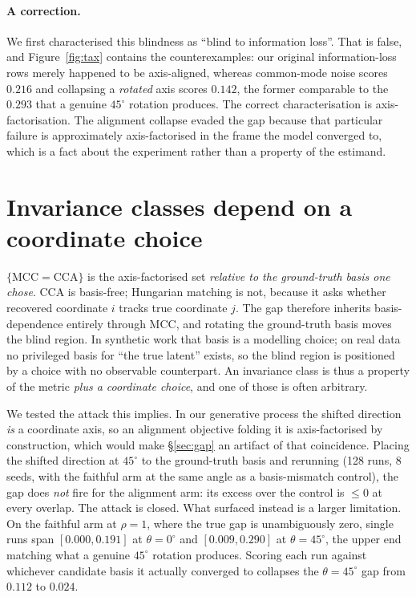 \documentclass[10pt]{article}
\begin{document}
\paragraph{A correction.} We first characterised this blindness as ``blind to information loss''. That
is false, and Figure~\ref{fig:tax} contains the counterexamples: our original information-loss rows
merely happened to be axis-aligned, whereas common-mode noise scores $0.216$ and collapsing a
\emph{rotated} axis scores $0.142$, the former comparable to the $0.293$ that a genuine $45^{\circ}$
rotation produces. The correct characterisation is axis-factorisation. The alignment collapse evaded
the gap because that particular failure is approximately axis-factorised in the frame the model
converged to, which is a fact about the experiment rather than a property of the estimand.

\section{Invariance classes depend on a coordinate choice}
\label{sec:basis}

$\{\mathrm{MCC}=\mathrm{CCA}\}$ is the axis-factorised set \emph{relative to the ground-truth basis one
chose}. CCA is basis-free; Hungarian matching is not, because it asks whether recovered coordinate $i$
tracks true coordinate $j$. The gap therefore inherits basis-dependence entirely through MCC, and
rotating the ground-truth basis moves the blind region. In synthetic work that basis is a modelling
choice; on real data no privileged basis for ``the true latent'' exists, so the blind region is
positioned by a choice with no observable counterpart. An invariance class is thus a property of the
metric \emph{plus a coordinate choice}, and one of those is often arbitrary.

We tested the attack this implies. In our generative process the shifted direction \emph{is} a
coordinate axis, so an alignment objective folding it is axis-factorised by construction, which would
make \S\ref{sec:gap} an artifact of that coincidence. Placing the shifted direction at $45^{\circ}$ to
the ground-truth basis and rerunning (128 runs, 8 seeds, with the faithful arm at the same angle as a
basis-mismatch control), the gap does \emph{not} fire for the alignment arm: its excess over the control
is $\leq0$ at every overlap. The attack is closed. What surfaced instead is a larger limitation. On the
faithful arm at $\rho=1$, where the true gap is unambiguously zero, single runs span $[0.000,0.191]$ at
$\theta=0^{\circ}$ and $[0.009,0.290]$ at $\theta=45^{\circ}$, the upper end matching what a genuine
$45^{\circ}$ rotation produces. Scoring each run against whichever candidate basis it actually
converged to collapses the $\theta=45^{\circ}$ gap from $0.112$ to $0.024$.
\end{document}
